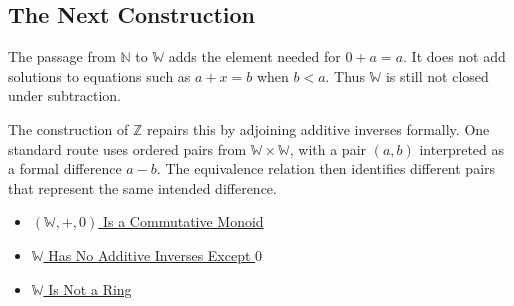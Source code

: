\subsection*{The Next Construction}

\begin{remark*}[Exposition]
The passage from $\mathbb{N}$ to $\mathbb{W}$ adds the element needed for
$0+a=a$. It does not add solutions to equations such as $a+x=b$ when
$b<a$. Thus $\mathbb{W}$ is still not closed under subtraction.
\end{remark*}

\begin{remark*}[Exposition]
The construction of $\mathbb{Z}$ repairs this by adjoining additive inverses
formally. One standard route uses ordered pairs from
$\mathbb{W}\times\mathbb{W}$, with a pair $(a,b)$ interpreted as a formal
difference $a-b$. The equivalence relation then identifies different pairs
that represent the same intended difference.
\end{remark*}

\begin{dependencies}
\begin{itemize}
  \item \hyperref[thm:w-additive-commutative-monoid]{$(\mathbb{W},+,0)$ Is a Commutative Monoid}
  \item \hyperref[thm:w-has-no-additive-inverses-except-zero]{$\mathbb{W}$ Has No Additive Inverses Except $0$}
  \item \hyperref[thm:w-is-not-a-ring]{$\mathbb{W}$ Is Not a Ring}
\end{itemize}
\end{dependencies}
